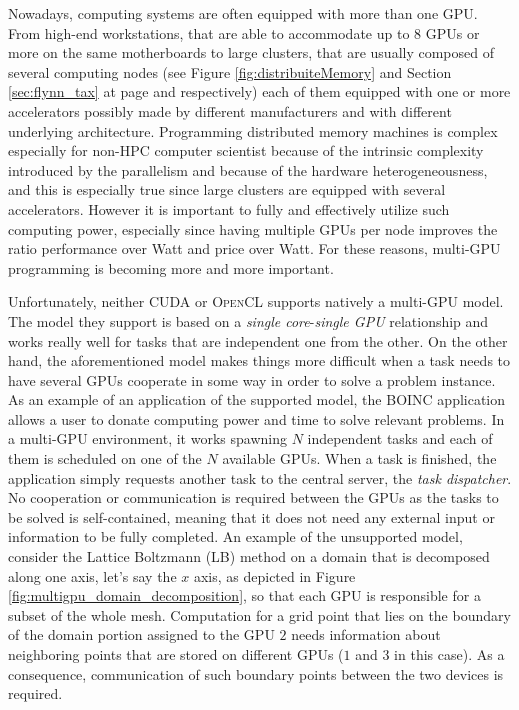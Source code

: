 Nowadays, computing systems are often equipped with more than one GPU.
From high-end workstations, that are able to accommodate up to 8 GPUs or more on the same motherboards to large clusters, that are usually composed of several computing nodes (see Figure \ref{fig:distribuiteMemory} and Section \ref{sec:flynn_tax} at page \pageref{fig:distribuiteMemory} and \pageref{sec:flynn_tax} respectively) each of them equipped with one or more accelerators possibly made by different manufacturers and with different underlying architecture.
Programming distributed memory machines is complex especially for non-HPC computer scientist because of the intrinsic complexity introduced by the parallelism and because of the hardware heterogeneousness, and this is especially true since large clusters are equipped with several accelerators.
However it is important to fully and effectively utilize such computing power, especially since having multiple GPUs per node improves the ratio performance over Watt and price over Watt.
For these reasons, multi-GPU programming is becoming more and more important.

Unfortunately, neither \textsc{CUDA} or \textsc{OpenCL} supports natively a multi-GPU model.
The model they support is based on a \textit{single core}-\textit{single GPU} relationship and works really well for tasks that are independent one from the other.
On the other hand, the aforementioned model makes things more difficult when a task needs to have several GPUs cooperate in some way in order to solve a problem instance.
As an example of an application of the supported model, the \textsc{BOINC} application \cite{Anderson:2004} allows a user to donate computing power and time to solve relevant problems.
In a multi-GPU environment, it works spawning $N$ independent tasks and each of them is scheduled on one of the $N$ available GPUs.
When a task is finished, the application simply requests another task to the central server, the \textit{task dispatcher}.
No cooperation or communication is required between the GPUs as the tasks to be solved is self-contained, meaning that it does not need any external input or information to be fully completed.
An example of the unsupported model, consider the Lattice Boltzmann (LB) \cite{McNamara&Zanetti-1988} \cite{Aidun2010439} \cite{Higuera&Jimenez-1989} method on a domain that is decomposed along one axis, let's say the $x$ axis, as depicted in Figure \ref{fig:multigpu_domain_decomposition}, so that each GPU is responsible for a subset of the whole mesh.
Computation for a grid point that lies on the boundary of the domain portion assigned to the GPU $2$ needs information about neighboring points that are stored on different GPUs ($1$ and $3$ in this case). As a consequence, 
communication of such boundary points between the two devices is required.

